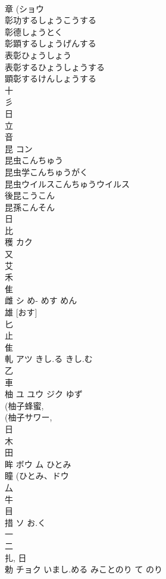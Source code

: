 \documentclass[8pt]{extreport}
\begin{document}
\begin{CJK}{UTF8}{min}
\\	章 (ショウ 
\\	彰功するしょうこうする
\\	彰德しょうとく
\\	彰顕するしょうげんする
\\	表彰ひょうしょう
\\	表彰するひょうしょうする
\\	顕彰するけんしょうする
\\	十 
\\	彡 
\\	日 
\\	立 
\\	音 
\\	昆	コン		
\\	昆虫こんちゅう 
\\	昆虫学こんちゅうがく 
\\	昆虫ウイルスこんちゅうウイルス 
\\	後昆こうこん 
\\	昆孫こんそん 
\\	日 
\\	比 
\\	穫	カク		
\\	又 
\\	艾 
\\	禾 
\\	隹 
\\	雌	シ	め- めす めん	
\\	雄 [おす] 
\\	匕 
\\	止 
\\	隹 
\\	軋	アツ	きし.る きし.む	
\\	乙 
\\	車 
\\	柚	ユ ユウ ジク	ゆず	
\\	(柚子蜂蜜, 
\\	(柚子サワー, 
\\	日 
\\	木 
\\	田 
\\	眸	ボウ ム	ひとみ	
\\	瞳 (ひとみ、ドウ 
\\	厶 
\\	牛 
\\	目 
\\	措	ソ	お.く	
\\	一 
\\	二 
\\	扎, 日 
\\	勅	チョク	いまし.める みことのり て のり	

\end{CJK}
\end{document}
